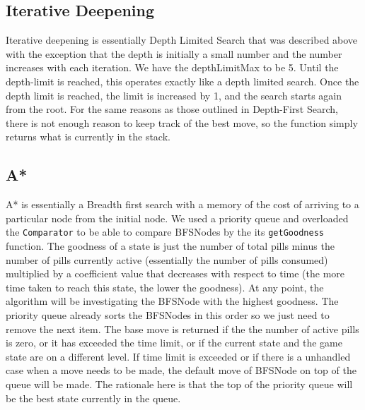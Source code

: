 \documentclass[a4paper]{article}
\begin{document}
\subsection{Iterative Deepening}
Iterative deepening is essentially Depth Limited Search that was described above with the exception that the depth is initially a small number and the number increases with each iteration. We have the depthLimitMax to be 5. Until the depth-limit is reached, this operates exactly like a depth limited search.  Once the depth limit is reached, the limit is increased  by 1, and the search starts again from the root. For the same reasons as those outlined in Depth-First Search, there is not enough reason to keep track of the best move, so the function simply returns what is currently in the stack.    

\subsection{A*}
A* is essentially a Breadth first search with a memory of the cost of arriving to a particular node from the initial node. We used a priority queue and overloaded the \texttt{Comparator} to be able to compare BFSNodes by the its \texttt{getGoodness} function. The goodness of a state is just the number of total pills minus the number of pills currently active (essentially the number of pills consumed) multiplied by a coefficient value that decreases with respect to time (the more time taken to reach this state, the lower the goodness). At any point, the algorithm will be investigating the BFSNode with the highest goodness. The priority queue already sorts the BFSNodes in this order so we just need to remove the next item.  The base move is returned if the the number of active pills is zero, or it has exceeded the time limit, or if the current state and the game state are on a different level.  If time limit is exceeded or if there is a unhandled case when a move needs to be made, the default move of BFSNode on top of the queue will be made.  The rationale here is that the top of the priority queue will be the best state currently in the queue.
\end{document}
